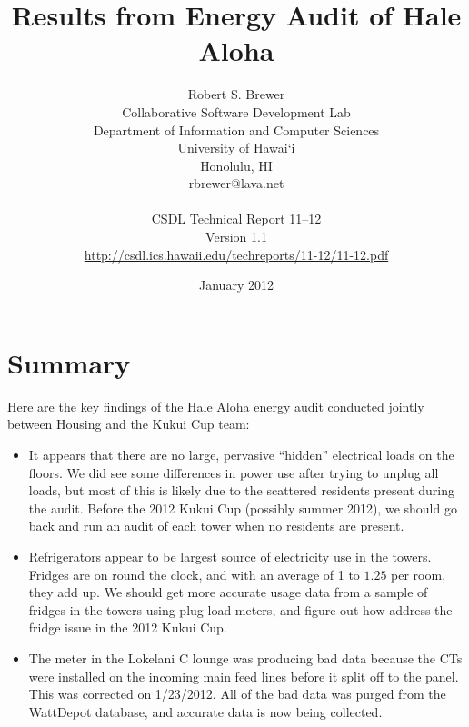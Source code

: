 \documentclass[11pt,final]{article}
\begin{document}
\title{Results from Energy Audit of Hale Aloha}
\author{Robert S. Brewer \\
Collaborative Software Development Lab \\
Department of Information and Computer Sciences \\
University of Hawai`i \\
Honolulu, HI \\
rbrewer@lava.net \\
\\
CSDL Technical Report 11--12 \\
Version 1.1 \\
\url{http://csdl.ics.hawaii.edu/techreports/11-12/11-12.pdf}
}
\date{January 2012}

\maketitle

\section{Summary}

Here are the key findings of the Hale Aloha energy audit conducted jointly between Housing and the Kukui Cup team:

\begin{itemize}
\item It appears that there are no large, pervasive ``hidden'' electrical loads on the floors. We did see some differences in power use after trying to unplug all loads, but most of this is likely due to the scattered residents present during the audit. Before the 2012 Kukui Cup (possibly summer 2012), we should go back and run an audit of each tower when no residents are present.
\item Refrigerators appear to be largest source of electricity use in the towers. Fridges are on round the clock, and with an average of 1 to $1.25$ per room, they add up. We should get more accurate usage data from a sample of fridges in the towers using plug load meters, and figure out how address the fridge issue in the 2012 Kukui Cup.
\item The meter in the Lokelani C lounge was producing bad data because the CTs were installed on the incoming main feed lines before it split off to the panel. This was corrected on 1/23/2012. All of the bad data was purged from the WattDepot database, and accurate data is now being collected.
\end{itemize}
\end{document}

